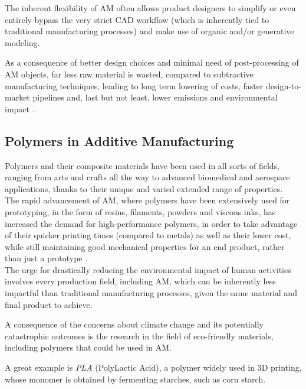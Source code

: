 \documentclass{article}
\begin{document}
    The inherent flexibility of AM often allows product designers to simplify or even entirely bypass the very strict CAD workflow (which is inherently tied to 
    traditional manufacturing processes) and make use of organic and/or generative modeling. 

    As a consequence of better design choices and minimal need of post-processing of AM objects, far less raw material is wasted, compared to subtractive manufacturing techniques, leading to 
    long term lowering of costs, faster design-to-market pipelines and, last but not least, lower emissions and environmental impact \autocite*{Recent_progress_polymers_AM}. 

    \subsection{Polymers in Additive Manufacturing\label{Polymers_in_AM}}

    Polymers and their composite materials have been used in all sorts of fields, ranging from arts and crafts all the way to advanced biomedical and aerospace applications, thanks 
    to their unique and varied extended range of properties. \\  
    
    The rapid advancement of AM, where polymers have been extensively used for prototyping, in the form of resins, filaments, powders and viscous inks, 
    has increased the demand for high-performance polymers, in order to take advantage of their quicker printing times (compared to metals) as well as their lower cost, while still
    maintaining good mechanical properties for an end product, rather than just a prototype \autocite*{Recent_progress_polymers_AM}. \\ 

    The urge for drastically reducing the environmental impact of human activities involves every production field, including AM, which can be inherently less impactful
    than traditional manufacturing processes, given the same material and final product to achieve. 

    A consequence of the concerns about climate change and its potentially catastrophic outcomes is the research in the field of eco-friendly materials, including polymers 
    that could be used in AM. 
    
    A great example is \textit{PLA} (PolyLactic Acid), a polymer widely used in 3D printing, whose monomer is obtained by fermenting starches, such as corn starch. \\ 
\end{document}
